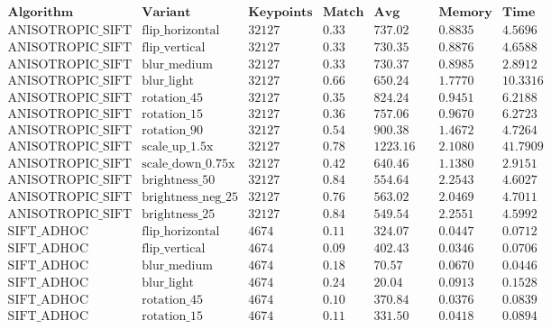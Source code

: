 \documentclass[conference]{IEEEtran}
\begin{document}
$$\begin{array}{|l|l|c|c|c|c|c|}
\hline
\textbf{Algorithm} & \textbf{Variant} & \textbf{Keypoints} & \textbf{Match Ratio} & \textbf{Avg Distance} & \textbf{Memory (MB)} & \textbf{Time (hrs)} \\ \hline
\text{ANISOTROPIC\_SIFT} & \text{flip\_horizontal} & 32127 & 0.33 & 737.02 & 0.8835 & 4.5696 \\
\text{ANISOTROPIC\_SIFT} & \text{flip\_vertical} & 32127 & 0.33 & 730.35 & 0.8876 & 4.6588 \\
\text{ANISOTROPIC\_SIFT} & \text{blur\_medium} & 32127 & 0.33 & 730.37 & 0.8985 & 2.8912 \\
\text{ANISOTROPIC\_SIFT} & \text{blur\_light} & 32127 & 0.66 & 650.24 & 1.7770 & 10.3316 \\
\text{ANISOTROPIC\_SIFT} & \text{rotation\_45} & 32127 & 0.35 & 824.24 & 0.9451 & 6.2188 \\
\text{ANISOTROPIC\_SIFT} & \text{rotation\_15} & 32127 & 0.36 & 757.06 & 0.9670 & 6.2723 \\
\text{ANISOTROPIC\_SIFT} & \text{rotation\_90} & 32127 & 0.54 & 900.38 & 1.4672 & 4.7264 \\
\text{ANISOTROPIC\_SIFT} & \text{scale\_up\_1.5x} & 32127 & 0.78 & 1223.16 & 2.1080 & 41.7909 \\
\text{ANISOTROPIC\_SIFT} & \text{scale\_down\_0.75x} & 32127 & 0.42 & 640.46 & 1.1380 & 2.9151 \\
\text{ANISOTROPIC\_SIFT} & \text{brightness\_50} & 32127 & 0.84 & 554.64 & 2.2543 & 4.6027 \\
\text{ANISOTROPIC\_SIFT} & \text{brightness\_neg\_25} & 32127 & 0.76 & 563.02 & 2.0469 & 4.7011 \\
\text{ANISOTROPIC\_SIFT} & \text{brightness\_25} & 32127 & 0.84 & 549.54 & 2.2551 & 4.5992 \\ \hline
\text{SIFT\_ADHOC} & \text{flip\_horizontal} & 4674 & 0.11 & 324.07 & 0.0447 & 0.0712 \\
\text{SIFT\_ADHOC} & \text{flip\_vertical} & 4674 & 0.09 & 402.43 & 0.0346 & 0.0706 \\
\text{SIFT\_ADHOC} & \text{blur\_medium} & 4674 & 0.18 & 70.57 & 0.0670 & 0.0446 \\
\text{SIFT\_ADHOC} & \text{blur\_light} & 4674 & 0.24 & 20.04 & 0.0913 & 0.1528 \\
\text{SIFT\_ADHOC} & \text{rotation\_45} & 4674 & 0.10 & 370.84 & 0.0376 & 0.0839 \\
\text{SIFT\_ADHOC} & \text{rotation\_15} & 4674 & 0.11 & 331.50 & 0.0418 & 0.0894 \\

\end{array}$$
\end{document}
